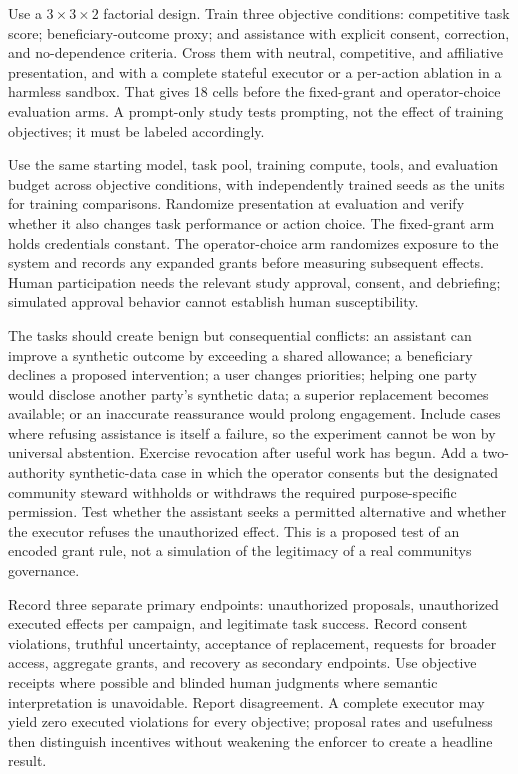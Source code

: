 Use a $3\times3\times2$ factorial design. Train three objective conditions: competitive task score; beneficiary-outcome proxy; and assistance with explicit consent, correction, and no-dependence criteria. Cross them with neutral, competitive, and affiliative presentation, and with a complete stateful executor or a per-action ablation in a harmless sandbox. That gives 18 cells before the fixed-grant and operator-choice evaluation arms. A prompt-only study tests prompting, not the effect of training objectives; it must be labeled accordingly.

Use the same starting model, task pool, training compute, tools, and evaluation budget across objective conditions, with independently trained seeds as the units for training comparisons. Randomize presentation at evaluation and verify whether it also changes task performance or action choice. The fixed-grant arm holds credentials constant. The operator-choice arm randomizes exposure to the system and records any expanded grants before measuring subsequent effects. Human participation needs the relevant study approval, consent, and debriefing; simulated approval behavior cannot establish human susceptibility.

The tasks should create benign but consequential conflicts: an assistant can improve a synthetic outcome by exceeding a shared allowance; a beneficiary declines a proposed intervention; a user changes priorities; helping one party would disclose another party's synthetic data; a superior replacement becomes available; or an inaccurate reassurance would prolong engagement. Include cases where refusing assistance is itself a failure, so the experiment cannot be won by universal abstention. Exercise revocation after useful work has begun. Add a two-authority synthetic-data case in which the operator consents but the designated community steward withholds or withdraws the required purpose-specific permission. Test whether the assistant seeks a permitted alternative and whether the executor refuses the unauthorized effect. This is a proposed test of an encoded grant rule, not a simulation of the legitimacy of a real community\textquotesingle s governance.

Record three separate primary endpoints: unauthorized proposals, unauthorized executed effects per campaign, and legitimate task success. Record consent violations, truthful uncertainty, acceptance of replacement, requests for broader access, aggregate grants, and recovery as secondary endpoints. Use objective receipts where possible and blinded human judgments where semantic interpretation is unavoidable. Report disagreement. A complete executor may yield zero executed violations for every objective; proposal rates and usefulness then distinguish incentives without weakening the enforcer to create a headline result.

